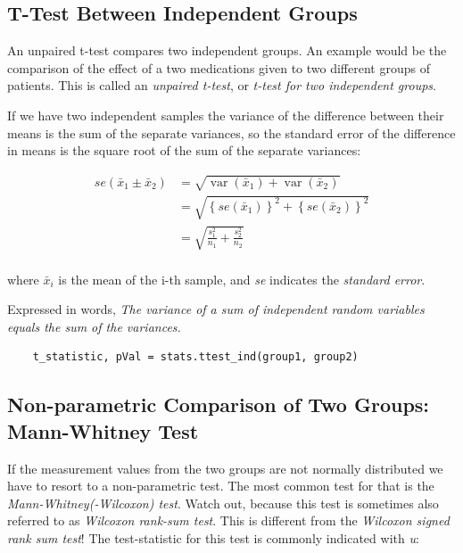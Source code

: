 \subsection{T-Test Between Independent Groups} 
An \gls{unpaired} t-test compares two independent groups. An example would be the comparison of the effect of a two medications given to two different groups of patients. This is called an \emph{unpaired t-test}, or \emph{t-test for two independent groups}.

If we have two independent samples the variance of the difference between their means is the sum of the separate variances, so the standard error of the difference in means is the square root of the sum of the separate variances:

\begin{align*}
   se({{\bar x}_1} \pm {{\bar x}_2}) &= \sqrt {\operatorname{var} ({{\bar x}_1}) + \operatorname{var} ({{\bar x}_2})}  \\
   &= \sqrt {{{\left\{ {se({{\bar x}_1})} \right\}}^2} + {{\left\{ {se({{\bar x}_2})} \right\}}^2}}  \\
   &= \sqrt {\frac{{s_1^2}}{{{n_1}}} + \frac{{s_2^2}}{{{n_2}}}}  \\
\end{align*}

where $\bar{x}_i$ is the mean of the i-th sample, and \emph{se} indicates the \emph{standard error}.

Expressed in words, \emph{The variance of a sum of independent random variables equals the sum of the variances.}

\begin{lstlisting}
    t_statistic, pVal = stats.ttest_ind(group1, group2)
\end{lstlisting}

\subsection{Non-parametric Comparison of Two Groups: Mann-Whitney Test} \label{test:Mann-Whitney}

If the measurement values from the two groups are not normally distributed we have to resort to a non-parametric test. The most common test for that is the \emph{Mann-Whitney(-Wilcoxon) test}. Watch out, because this test is sometimes also referred to as \emph{Wilcoxon rank-sum test}. This is different from the \emph{Wilcoxon signed rank sum test}!
The test-statistic for this test is commonly indicated with \emph{u}:


